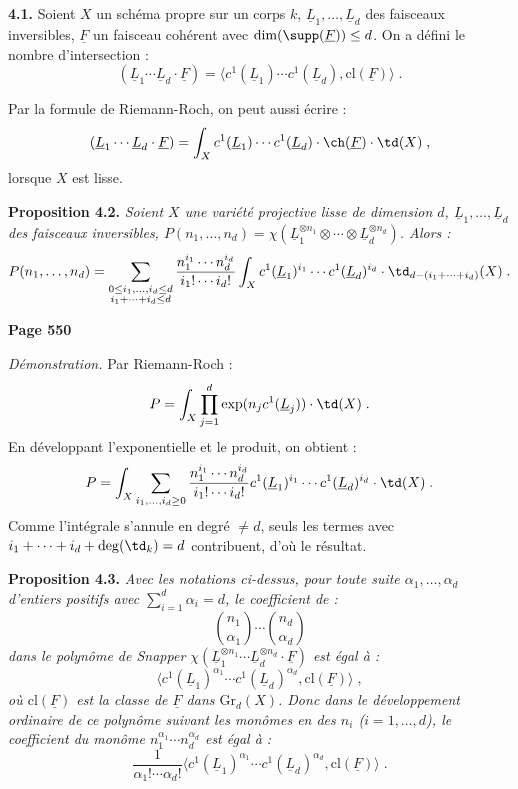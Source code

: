 \smallskip
\noindent\textbf{4.1.} Soient $X$ un sch\'ema propre sur un corps $k$, $\underline{L}_1, \ldots, \underline{L}_d$ des faisceaux inversibles, $\underline{F}$ un faisceau coh\'erent avec $\dim(\supp(\underline{F})) \leq d$. On a d\'efini le nombre d'intersection :
\[
(\underline{L}_1 \cdots \underline{L}_d \cdot \underline{F}) = \langle c^1(\underline{L}_1) \cdots c^1(\underline{L}_d), \mathrm{cl}(\underline{F}) \rangle\;.
\]

Par la formule de Riemann-Roch, on peut aussi \'ecrire :
\[
(\underline{L}_1 \cdots \underline{L}_d \cdot \underline{F}) = \int_X c^1(\underline{L}_1) \cdots c^1(\underline{L}_d) \cdot \ch(\underline{F}) \cdot \td(X)\;,
\]
lorsque $X$ est lisse.

\smallskip
\noindent\textbf{Proposition 4.2.} \textit{Soient $X$ une vari\'et\'e projective lisse de dimension $d$, $\underline{L}_1, \ldots, \underline{L}_d$ des faisceaux inversibles, $P(n_1, \ldots, n_d) = \chi(\underline{L}_1^{\otimes n_1} \otimes \cdots \otimes \underline{L}_d^{\otimes n_d})$. Alors :
\[
P(n_1, \ldots, n_d) = \sum_{\substack{0 \leq i_1, \ldots, i_d \leq d\\i_1 + \cdots + i_d \leq d}} \frac{n_1^{i_1} \cdots n_d^{i_d}}{i_1! \cdots i_d!} \int_X c^1(\underline{L}_1)^{i_1} \cdots c^1(\underline{L}_d)^{i_d} \cdot \td_{d - (i_1 + \cdots + i_d)}(X)\;.
\]}

\newpage
\noindent\textbf{Page 550}

\textit{D\'emonstration.} Par Riemann-Roch :
\[
P = \int_X \prod_{j=1}^d \exp(n_j c^1(\underline{L}_j)) \cdot \td(X)\;.
\]
En d\'eveloppant l'exponentielle et le produit, on obtient :
\[
P = \int_X \sum_{i_1, \ldots, i_d \geq 0} \frac{n_1^{i_1} \cdots n_d^{i_d}}{i_1! \cdots i_d!} c^1(\underline{L}_1)^{i_1} \cdots c^1(\underline{L}_d)^{i_d} \cdot \td(X)\;.
\]
Comme l'int\'egrale s'annule en degr\'e $\neq d$, seuls les termes avec $i_1 + \cdots + i_d + \deg(\td_k) = d$ contribuent, d'o\`u le r\'esultat.

\smallskip
\noindent\textbf{Proposition 4.3.} \textit{Avec les notations ci-dessus, pour toute suite $\alpha_1, \ldots, \alpha_d$ d'entiers positifs avec $\sum_{i=1}^d \alpha_i = d$, le coefficient de :
\[
\binom{n_1}{\alpha_1} \cdots \binom{n_d}{\alpha_d}
\]
dans le polyn\^ome de Snapper $\chi(\underline{L}_1^{\otimes n_1} \cdots \underline{L}_d^{\otimes n_d} \cdot \underline{F})$ est \'egal \`a :
\begin{equation}\tag{4.3.2}
\langle c^1(\underline{L}_1)^{\alpha_1} \cdots c^1(\underline{L}_d)^{\alpha_d}, \mathrm{cl}(\underline{F}) \rangle\;,
\end{equation}
o\`u $\mathrm{cl}(\underline{F})$ est la classe de $\underline{F}$ dans $\mathrm{Gr}_d(X)$. Donc dans le d\'eveloppement ordinaire de ce polyn\^ome suivant les mon\^omes en des $n_i$ ($i = 1, \ldots, d$), le coefficient du mon\^ome $n_1^{\alpha_1} \cdots n_d^{\alpha_d}$ est \'egal \`a :
\[
\frac{1}{\alpha_1! \cdots \alpha_d!} \langle c^1(\underline{L}_1)^{\alpha_1} \cdots c^1(\underline{L}_d)^{\alpha_d}, \mathrm{cl}(\underline{F}) \rangle\;.
\]}

